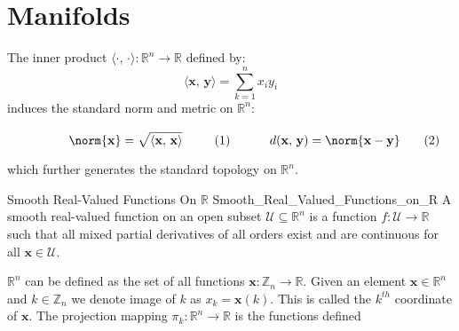 \section{Manifolds}
    The inner product
    $\langle{\cdot,\,\cdot\rangle}:\mathbb{R}^{n}\rightarrow\mathbb{R}$
    defined by:
    \begin{equation}
        \langle{\mathbf{x},\,\mathbf{y}}\rangle
        =\sum_{k=1}^{n}x_{i}y_{i}
    \end{equation}
    induces the standard norm and metric on $\mathbb{R}^{n}$:
    \par\hfill\par
    \begin{subequations}
        \begin{minipage}[b]{0.49\textwidth}
            \begin{equation}
                \norm{\mathbf{x}}
                =\sqrt{\langle{\mathbf{x},\,\mathbf{x}}\rangle}
            \end{equation}
        \end{minipage}
        \hfill
        \begin{minipage}[b]{0.49\textwidth}
            \begin{equation}
                d(\mathbf{x},\,\mathbf{y})
                =\norm{\mathbf{x}-\mathbf{y}}
            \end{equation}
        \end{minipage}
    \end{subequations}
    \par\vspace{2.5ex}
    which further generates the standard topology on $\mathbb{R}^{n}$.
    \begin{fdefinition}{Smooth Real-Valued Functions On $\mathbb{R}$}
                       {Smooth_Real_Valued_Functions_on_R}
        A smooth real-valued function on an open subset
        $\mathcal{U}\subseteq\mathbb{R}^{n}$ is a function
        $f:\mathcal{U}\rightarrow\mathbb{R}$ such that all mixed partial
        derivatives of all orders exist and are continuous for all
        $\mathbf{x}\in\mathcal{U}$.
    \end{fdefinition}
    $\mathbb{R}^{n}$ can be defined as the set of all functions
    $\mathbf{x}:\mathbb{Z}_{n}\rightarrow\mathbb{R}$. Given an element
    $\mathbf{x}\in\mathbb{R}^{n}$ and $k\in\mathbb{Z}_{n}$ we denote image
    of $k$ as $x_{k}=\mathbf{x}(k)$. This is called the $k^{th}$ coordinate
    of $\mathbf{x}$. The projection mapping
    $\pi_{k}:\mathbb{R}^{n}\rightarrow\mathbb{R}$ is the functions defined
